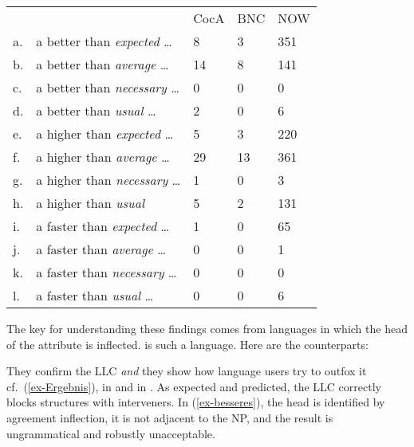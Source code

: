 \documentclass[output=paper
  ,nobabel
  ,uniformtopskip %
]{langscibook}
\begin{document}
\ea\label{ex-than}
\begin{tabular}[t]{lllll}
& & CocA & BNC & NOW\\
a. & a better than \emph{expected} \ldots & 8 & 3 & 351\\
b. & a better than \emph{average} \ldots & 14 & 8 & 141\\
c. & a better than \emph{necessary} \ldots & 0 & 0 & 0\\
d. & a better than \emph{usual} \ldots & 2 & 0 & 6\\
e. & a higher than \emph{expected} \ldots & 5 & 3 & 220\\
f. & a higher than \emph{average} \ldots & 29 & 13 & 361\\
g. & a higher than \emph{necessary} \ldots & 1 & 0 & 3\\
h. & a higher than \emph{usual} & 5 & 2 & 131\\
i. & a faster than \emph{expected} \ldots & 1 & 0 & 65\\
j. & a faster than \emph{average} \ldots & 0 & 0 & 1\\
k. & a faster than \emph{necessary} \ldots & 0 & 0 & 0\\
l. & a faster than \emph{usual} \ldots & 0 & 0 & 6
\end{tabular}
\z

\noindent
The key for understanding these findings comes from languages in which the head of the attribute is
inflected.  is such a language. Here are the  counterparts:

\eal\label{ex-besseres}


\zl

\noindent
They confirm the LLC \emph{and} they show how language users try to outfox it cf.\ (\ref{ex-Ergebnis}), in  and in . As expected and predicted, the LLC correctly blocks structures with interveners. In (\ref{ex-besseres}), the head is identified by agreement inflection, it is not adjacent to the NP, and the result is ungrammatical and robustly unacceptable.
\end{document}
